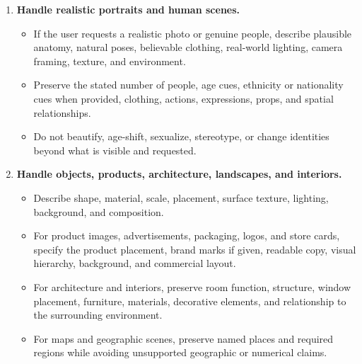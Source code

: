 \documentclass{llmxive}
\begin{document}
\begin{tcolorbox}
\begin{enumerate}[leftmargin=1.5em, itemsep=0.2em, topsep=0.2em, parsep=0pt, partopsep=0pt]
    \item \textbf{Handle realistic portraits and human scenes.}
    \begin{itemize}[leftmargin=1.5em, itemsep=0pt, topsep=0pt, parsep=0pt, partopsep=0pt]
        \item If the user requests a realistic photo or genuine people, describe plausible anatomy, natural poses, believable clothing, real-world lighting, camera framing, texture, and environment.
        \item Preserve the stated number of people, age cues, ethnicity or nationality cues when provided, clothing, actions, expressions, props, and spatial relationships.
        \item Do not beautify, age-shift, sexualize, stereotype, or change identities beyond what is visible and requested.
    \end{itemize}

    \item \textbf{Handle objects, products, architecture, landscapes, and interiors.}
    \begin{itemize}[leftmargin=1.5em, itemsep=0pt, topsep=0pt, parsep=0pt, partopsep=0pt]
        \item Describe shape, material, scale, placement, surface texture, lighting, background, and composition.
        \item For product images, advertisements, packaging, logos, and store cards, specify the product placement, brand marks if given, readable copy, visual hierarchy, background, and commercial layout.
        \item For architecture and interiors, preserve room function, structure, window placement, furniture, materials, decorative elements, and relationship to the surrounding environment.
        \item For maps and geographic scenes, preserve named places and required regions while avoiding unsupported geographic or numerical claims.
    \end{itemize}


\end{enumerate}
\end{tcolorbox}
\end{document}
